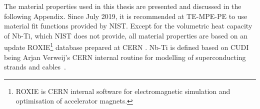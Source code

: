 
The material properties used in this thesis are presented and discussed in the following Appendix. Since July 2019, it is recommended at TE-MPE-PE to use material fit functions provided by NIST. Except for the volumetric heat capacity of Nb-Ti, which NIST does not provide, all material properties are based on an update ROXIE\footnote{ROXIE is CERN internal software for electromagnetic simulation and optimisation of accelerator magnets.} database prepared at CERN \cite{material_properties_roxie}. Nb-Ti is defined based on CUDI being Arjan Verweij's CERN internal routine for modelling of superconducting strands and cables~\cite{cudi_manual}.